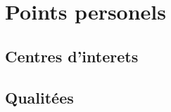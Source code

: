 \documentclass[11pt,a4paper]{moderncv}
\begin{document}
\section{Points personels}

\subsection{Centres d'interets}

\subsection{Qualitées}
\end{document}
